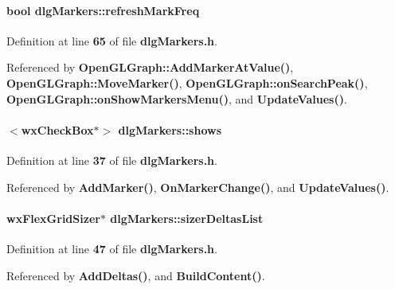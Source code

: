 \paragraph[{refresh\+Mark\+Freq}]{\setlength{\rightskip}{0pt plus 5cm}bool dlg\+Markers\+::refresh\+Mark\+Freq}\label{classdlgMarkers_aee2ff90daa0d514e1a4b4f16fc951933}


Definition at line {\bf 65} of file {\bf dlg\+Markers.\+h}.



Referenced by {\bf Open\+G\+L\+Graph\+::\+Add\+Marker\+At\+Value()}, {\bf Open\+G\+L\+Graph\+::\+Move\+Marker()}, {\bf Open\+G\+L\+Graph\+::on\+Search\+Peak()}, {\bf Open\+G\+L\+Graph\+::on\+Show\+Markers\+Menu()}, and {\bf Update\+Values()}.

\paragraph[{shows}]{$<$wx\+Check\+Box$\ast$$>$ dlg\+Markers\+::shows}\label{classdlgMarkers_a5013a12391317ab880b02b9f378a06d9}


Definition at line {\bf 37} of file {\bf dlg\+Markers.\+h}.



Referenced by {\bf Add\+Marker()}, {\bf On\+Marker\+Change()}, and {\bf Update\+Values()}.

\paragraph[{sizer\+Deltas\+List}]{\setlength{\rightskip}{0pt plus 5cm}wx\+Flex\+Grid\+Sizer$\ast$ dlg\+Markers\+::sizer\+Deltas\+List}\label{classdlgMarkers_a86b82ea5da4e1e17531f88bae3843afe}


Definition at line {\bf 47} of file {\bf dlg\+Markers.\+h}.



Referenced by {\bf Add\+Deltas()}, and {\bf Build\+Content()}.

